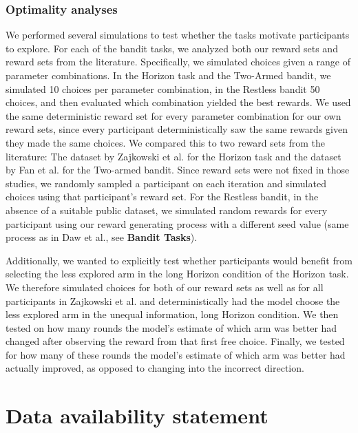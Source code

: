 \documentclass[fleqn,10pt]{wlscirep}
\begin{document}
\subsubsection*{Optimality analyses}

We performed several simulations to test whether the tasks motivate participants to explore. For each of the bandit tasks, we analyzed both our reward sets and reward sets from the literature. Specifically, we simulated choices given a range of parameter combinations. In the Horizon task and the Two-Armed bandit, we simulated 10 choices per parameter combination, in the Restless bandit 50 choices, and then evaluated which combination yielded the best rewards. We used the same deterministic reward set for every parameter combination for our own reward sets, since every participant deterministically saw the same rewards given they made the same choices. We compared this to two reward sets from the literature: The dataset by Zajkowski et al. \cite{zajkowski_causal_2017} for the Horizon task and the dataset by Fan et al.\cite{fan_trait_2023} for the Two-armed bandit. Since reward sets were not fixed in those studies, we randomly sampled a participant on each iteration and simulated choices using that participant's reward set. For the Restless bandit, in the absence of a suitable public dataset, we simulated random rewards for every participant using our reward generating process with a different seed value (same process as in Daw et al.\cite{daw_cortical_2006}, see \textbf{Bandit Tasks}).

Additionally, we wanted to explicitly test whether participants would benefit from selecting the less explored arm in the long Horizon condition of the Horizon task. We therefore simulated choices for both of our reward sets as well as for all participants in Zajkowski et al.\cite{zajkowski_causal_2017} and deterministically had the model choose the less explored arm in the unequal information, long Horizon condition. We then tested on how many rounds the model's estimate of which arm was better had changed after observing the reward from that first free choice. Finally, we tested for how many of these rounds the model's estimate of which arm was better had actually improved, as opposed to changing into the incorrect direction. 

\section*{Data availability statement}
\end{document}
